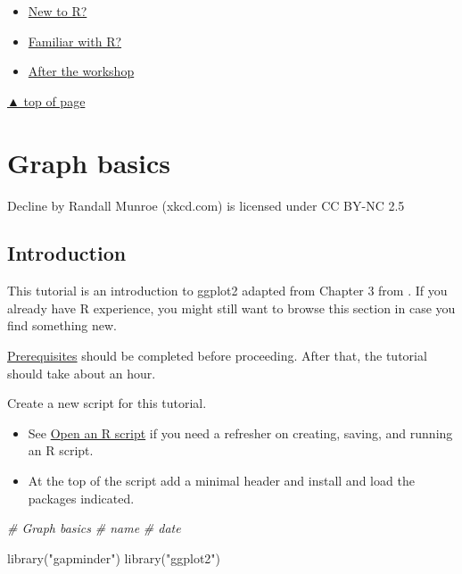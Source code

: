 \documentclass[
]{book}
\newenvironment{Shaded}{\begin{snugshade}}{\end{snugshade}}
\newcommand{\CommentTok}[1]{\textcolor[rgb]{0.56,0.35,0.01}{\textit{#1}}}
\newcommand{\FunctionTok}[1]{\textcolor[rgb]{0.00,0.00,0.00}{#1}}
\newcommand{\NormalTok}[1]{#1}
\newcommand{\StringTok}[1]{\textcolor[rgb]{0.31,0.60,0.02}{#1}}
\providecommand{\tightlist}{%
  \setlength{\itemsep}{0pt}\setlength{\parskip}{0pt}}
\begin{document}
\begin{itemize}
\tightlist
\item
  \protect\hyperlink{new-to-r}{New to R?}\\
\item
  \protect\hyperlink{familiar-with-r}{Familiar with R?}\\
\item
  \protect\hyperlink{after-the-workshop}{After the workshop}
\end{itemize}

\protect\hyperlink{start-with-R}{▲ top of page}

\hypertarget{graph-basics}{%
\chapter{Graph basics}\label{graph-basics}}

Decline by Randall Munroe (xkcd.com) is licensed under CC BY-NC 2.5

\hypertarget{introduction-1}{%
\section{Introduction}\label{introduction-1}}

This tutorial is an introduction to ggplot2 adapted from Chapter 3 from \citep{Healy:2019}. If you already have R experience, you might still want to browse this section in case you find something new.

\protect\hyperlink{prerequisites}{Prerequisites} should be completed before proceeding. After that, the tutorial should take about an hour.

Create a new script for this tutorial.

\begin{itemize}
\tightlist
\item
  See \protect\hyperlink{open-an-r-script}{Open an R script} if you need a refresher on creating, saving, and running an R script.
\item
  At the top of the script add a minimal header and install and load the packages indicated.
\end{itemize}

\begin{Shaded}
\begin{Highlighting}[]
\CommentTok{\# Graph basics }
\CommentTok{\# name }
\CommentTok{\# date }

\FunctionTok{library}\NormalTok{(}\StringTok{"gapminder"}\NormalTok{)}
\FunctionTok{library}\NormalTok{(}\StringTok{"ggplot2"}\NormalTok{)}
\end{Highlighting}
\end{Shaded}
\end{document}

